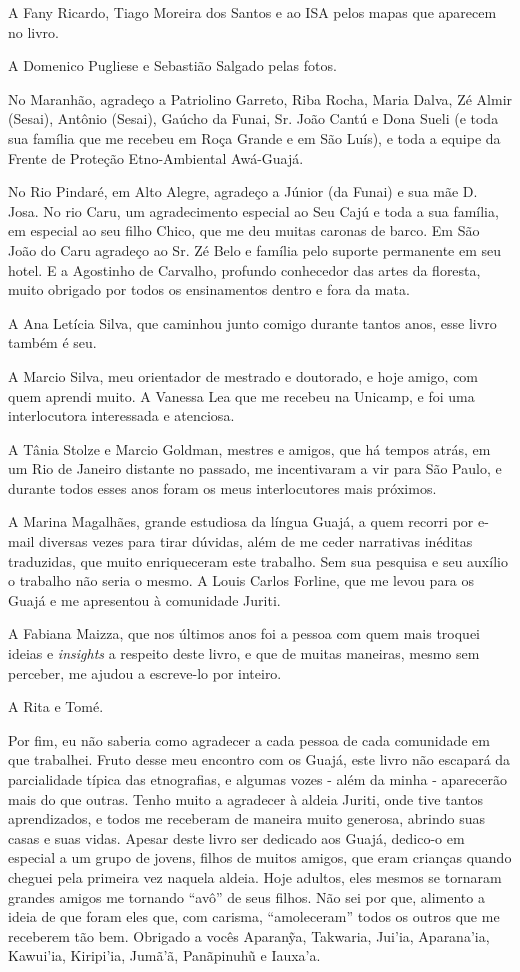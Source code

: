 A Fany Ricardo, Tiago Moreira dos Santos e ao ISA pelos mapas que
aparecem no livro.

A Domenico Pugliese e Sebastião Salgado pelas fotos.

No Maranhão, agradeço a Patriolino Garreto, Riba Rocha, Maria Dalva, Zé
Almir (Sesai), Antônio (Sesai), Gaúcho da Funai, Sr. João Cantú e Dona
Sueli (e toda sua família que me recebeu em Roça Grande e em São Luís),
e toda a equipe da Frente de Proteção Etno-Ambiental Awá-Guajá.

No Rio Pindaré, em Alto Alegre, agradeço a Júnior (da Funai) e sua mãe
D. Josa. No rio Caru, um agradecimento especial ao Seu Cajú e toda a sua
família, em especial ao seu filho Chico, que me deu muitas caronas de
barco. Em São João do Caru agradeço ao Sr. Zé Belo e família pelo
suporte permanente em seu hotel. E a Agostinho de Carvalho, profundo
conhecedor das artes da floresta, muito obrigado por todos os
ensinamentos dentro e fora da mata.

A Ana Letícia Silva, que caminhou junto comigo durante tantos anos, esse
livro também é seu.

A Marcio Silva, meu orientador de mestrado e doutorado, e hoje amigo,
com quem aprendi muito. A Vanessa Lea que me recebeu na Unicamp, e foi
uma interlocutora interessada e atenciosa.

A Tânia Stolze e Marcio Goldman, mestres e amigos, que há tempos atrás,
em um Rio de Janeiro distante no passado, me incentivaram a vir para São
Paulo, e durante todos esses anos foram os meus interlocutores mais
próximos.

A Marina Magalhães, grande estudiosa da língua Guajá, a quem recorri por
e-mail diversas vezes para tirar dúvidas, além de me ceder narrativas
inéditas traduzidas, que muito enriqueceram este trabalho. Sem sua
pesquisa e seu auxílio o trabalho não seria o mesmo. A Louis Carlos
Forline, que me levou para os Guajá e me apresentou à comunidade Juriti.

A Fabiana Maizza, que nos últimos anos foi a pessoa com quem mais
troquei ideias e \emph{insights} a respeito deste livro, e que de muitas
maneiras, mesmo sem perceber, me ajudou a escreve-lo por inteiro.

A Rita e Tomé.

Por fim, eu não saberia como agradecer a cada pessoa de cada comunidade
em que trabalhei. Fruto desse meu encontro com os Guajá, este livro não
escapará da parcialidade típica das etnografias, e algumas vozes - além
da minha - aparecerão mais do que outras. Tenho muito a agradecer à
aldeia Juriti, onde tive tantos aprendizados, e todos me receberam de
maneira muito generosa, abrindo suas casas e suas vidas. Apesar deste
livro ser dedicado aos Guajá, dedico-o em especial a um grupo de jovens,
filhos de muitos amigos, que eram crianças quando cheguei pela primeira
vez naquela aldeia. Hoje adultos, eles mesmos se tornaram grandes amigos
me tornando ``avô'' de seus filhos. Não sei por que, alimento a ideia de
que foram eles que, com carisma, ``amoleceram'' todos os outros que me
receberem tão bem. Obrigado a vocês Aparanỹa, Takwaria, Jui'ia,
Aparana'ia, Kawui'ia, Kiripi'ia, Jumã'ã, Panãpinuhũ e Iauxa'a.

